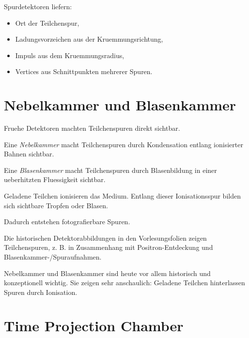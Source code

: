 \begin{examtipbox}
Spurdetektoren liefern:
\begin{itemize}
    \item Ort der Teilchenspur,
    \item Ladungsvorzeichen aus der Kruemmungsrichtung,
    \item Impuls aus dem Kruemmungsradius,
    \item Vertices aus Schnittpunkten mehrerer Spuren.
\end{itemize}
\end{examtipbox}

\section{Nebelkammer und Blasenkammer}

Fruehe Detektoren machten Teilchenspuren direkt sichtbar.

\begin{definitionbox}
Eine \emph{Nebelkammer} macht Teilchenspuren durch Kondensation entlang ionisierter
Bahnen sichtbar.
\end{definitionbox}

\begin{definitionbox}
Eine \emph{Blasenkammer} macht Teilchenspuren durch Blasenbildung in einer
ueberhitzten Fluessigkeit sichtbar.
\end{definitionbox}

\begin{conceptbox}
Geladene Teilchen ionisieren das Medium.
Entlang dieser Ionisationsspur bilden sich sichtbare Tropfen oder Blasen.

Dadurch entstehen fotografierbare Spuren.
\end{conceptbox}

\begin{notebox}
Die historischen Detektorabbildungen in den Vorlesungsfolien zeigen Teilchenspuren,
z. B. in Zusammenhang mit Positron-Entdeckung und Blasenkammer-/Spuraufnahmen.
\end{notebox}

\begin{examtipbox}
Nebelkammer und Blasenkammer sind heute vor allem historisch und konzeptionell wichtig.
Sie zeigen sehr anschaulich:
Geladene Teilchen hinterlassen Spuren durch Ionisation.
\end{examtipbox}

\section{Time Projection Chamber}

